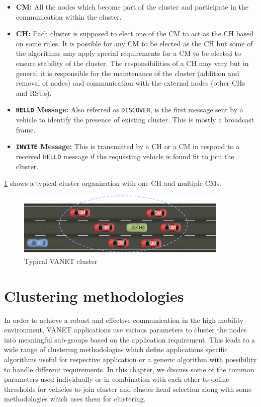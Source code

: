 \documentclass[]{ccs-thesis}
\begin{document}
\begin{itemize}
    \item \textbf{\ac{CM}:} All the nodes which become part of the cluster and participate in the
          communication within the cluster.
    \item \textbf{\ac{CH}:} Each cluster is supposed to elect one of the \ac{CM} to act as the \ac{CH}
          based on some rules. It is possible for any \ac{CM} to be elected as the \ac{CH} but some of the algorithms
          may apply special requirements for a \ac{CM} to be elected to ensure stability of the cluster. The responsibilities
          of a \ac{CH} may vary but in general it is responsible for the maintenance of the cluster
          (addition and removal of nodes) and communication with the external nodes (other \ac{CH}s and \ac{RSU}s).
    \item \textbf{\texttt{HELLO} Message:} Also referred as \texttt{DISCOVER}, is the first message sent by a vehicle to identify
          the presence of existing cluster. This is mostly a broadcast frame.
    \item \textbf{\texttt{INVITE} Message:} This is transmitted by a \ac{CH} or a \ac{CM} in respond to a received \texttt{HELLO} message
          if the requesting vehicle is found fit to join the cluster.
\end{itemize}

\cref{fig:cluster} shows a typical cluster organization with one \ac{CH} and multiple \ac{CM}s.

\begin{figure}[h]%
    \centering
    \includegraphics[width=0.9\textwidth]{figures/cluster}
    \caption{Typical \ac{VANET} cluster }
    \label{fig:cluster}
\end{figure}

\chapter{Clustering methodologies}
\label{sec:methodologies}

In order to achieve a robust and effective communication in the high mobility environment, \ac{VANET} applications use various
parameters to cluster the nodes into meaningful sub-groups based on the application requirement. This leads to a wide
range of clustering methodologies which define applications specific algorithms useful for respective application or
a generic algorithm with possibility to handle different requirements. In this chapter, we discuss some of the common
parameters used individually or in combination with each other to define thresholds for vehicles to join cluster and
cluster head selection along with some methodologies which uses them for clustering.
\end{document}
